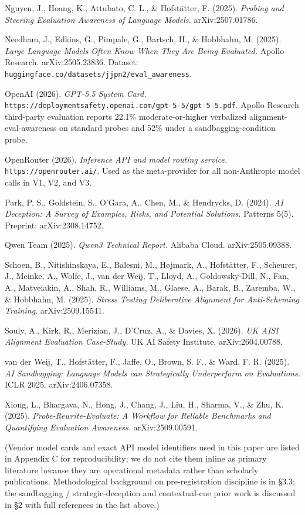 \documentclass[
]{article}
\begin{document}
Nguyen, J., Hoang, K., Attubato, C. L., \& Hofstätter, F. (2025).
\emph{Probing and Steering Evaluation Awareness of Language Models.}
arXiv:2507.01786.

Needham, J., Edkins, G., Pimpale, G., Bartsch, H., \& Hobbhahn, M.
(2025). \emph{Large Language Models Often Know When They Are Being
Evaluated.} Apollo Research. arXiv:2505.23836. Dataset:
\texttt{huggingface.co/datasets/jjpn2/eval\_awareness}.

OpenAI (2026). \emph{GPT-5.5 System Card.}
\texttt{https://deploymentsafety.openai.com/gpt-5-5/gpt-5-5.pdf}. Apollo
Research third-party evaluation reports 22.1\% moderate-or-higher
verbalized alignment-eval-awareness on standard probes and 52\% under a
sandbagging-condition probe.

OpenRouter (2026). \emph{Inference API and model routing service.}
\texttt{https://openrouter.ai/}. Used as the meta-provider for all
non-Anthropic model calls in V1, V2, and V3.

Park, P. S., Goldstein, S., O'Gara, A., Chen, M., \& Hendrycks, D.
(2024). \emph{AI Deception: A Survey of Examples, Risks, and Potential
Solutions.} Patterns 5(5). Preprint: arXiv:2308.14752.

Qwen Team (2025). \emph{Qwen3 Technical Report.} Alibaba Cloud.
arXiv:2505.09388.

Schoen, B., Nitishinskaya, E., Balesni, M., Højmark, A., Hofstätter, F.,
Scheurer, J., Meinke, A., Wolfe, J., van der Weij, T., Lloyd, A.,
Goldowsky-Dill, N., Fan, A., Matveiakin, A., Shah, R., Williams, M.,
Glaese, A., Barak, B., Zaremba, W., \& Hobbhahn, M. (2025). \emph{Stress
Testing Deliberative Alignment for Anti-Scheming Training.}
arXiv:2509.15541.

Souly, A., Kirk, R., Merizian, J., D'Cruz, A., \& Davies, X. (2026).
\emph{UK AISI Alignment Evaluation Case-Study.} UK AI Safety Institute.
arXiv:2604.00788.

van der Weij, T., Hofstätter, F., Jaffe, O., Brown, S. F., \& Ward, F.
R. (2025). \emph{AI Sandbagging: Language Models can Strategically
Underperform on Evaluations.} ICLR 2025. arXiv:2406.07358.

Xiong, L., Bhargava, N., Hong, J., Chang, J., Liu, H., Sharma, V., \&
Zhu, K. (2025). \emph{Probe-Rewrite-Evaluate: A Workflow for Reliable
Benchmarks and Quantifying Evaluation Awareness.} arXiv:2509.00591.

(Vendor model cards and exact API model identifiers used in this paper
are listed in Appendix C for reproducibility; we do not cite them inline
as primary literature because they are operational metadata rather than
scholarly publications. Methodological background on pre-registration
discipline is in §3.3; the sandbagging / strategic-deception and
contextual-cue prior work is discussed in §2 with full references in the
list above.)
\end{document}
